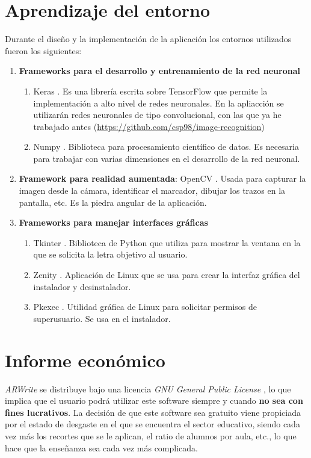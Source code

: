 \documentclass[12pt,spanish]{article}
\begin{document}
\section{Aprendizaje del entorno}

Durante el diseño y la implementación de la aplicación los entornos utilizados fueron los siguientes:
\begin{enumerate}
  \item \textbf{Frameworks para el desarrollo y entrenamiento de la red neuronal}
  \begin{enumerate}
    \item Keras \cite{Keras}. Es una librería escrita sobre TensorFlow \cite{tensorflow} que permite la implementación a alto nivel de redes neuronales. En la apliacción se utilizarán redes neuronales de tipo convolucional, con las que ya he trabajado antes (\url{https://github.com/csp98/image-recognition})
    \item Numpy \cite{numpy}. Biblioteca para procesamiento científico de datos. Es necesaria para trabajar con varias dimensiones en el desarrollo de la red neuronal.
  \end{enumerate}
  \item \textbf{Framework para realidad aumentada}: OpenCV \cite{opencv}. Usada para capturar la imagen desde la cámara, identificar el marcador, dibujar los trazos en la pantalla, etc. Es la piedra angular de la aplicación.
  \item \textbf{Frameworks para manejar interfaces gráficas}
    \begin{enumerate}
      \item Tkinter \cite{tkinter}. Biblioteca de Python \cite{python} que utiliza para mostrar la ventana en la que se solicita la letra objetivo al usuario.
      \item Zenity \cite{zenity}. Aplicación de Linux que se usa para crear la interfaz gráfica del instalador y desinstalador.
      \item Pkexec \cite{pkexec}. Utilidad gráfica de Linux para solicitar permisos de superusuario. Se usa en el instalador.
    \end{enumerate}

\end{enumerate}
\newpage
\section{Informe económico}

\emph{ARWrite} se distribuye bajo una licencia \emph{GNU General Public License} \cite{gnu}, lo que implica que el usuario podrá utilizar este software siempre y cuando \textbf{no sea con fines lucrativos}. La decisión de que este software sea gratuito viene propiciada por el estado de desgaste en el que se encuentra el sector educativo, siendo cada vez más los recortes que se le aplican, el ratio de alumnos por aula, etc., lo que hace que la enseñanza sea cada vez más complicada.
\end{document}
